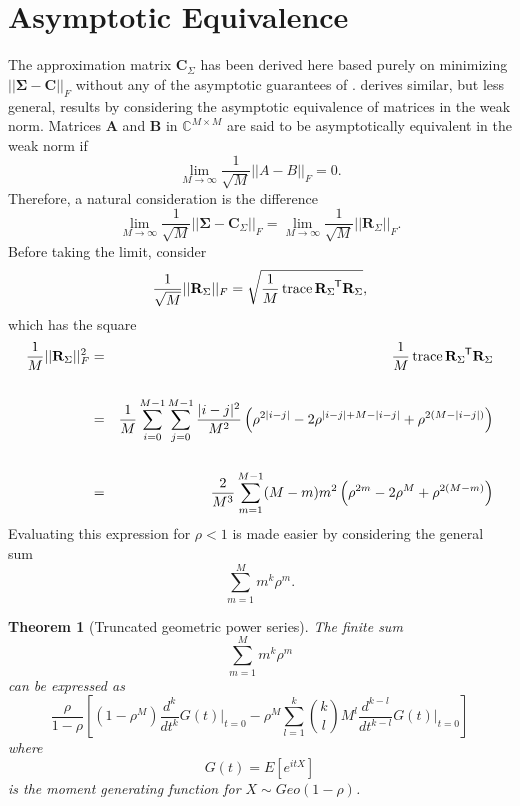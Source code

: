 \documentclass[letterpaper,12pt,oneside,final]{article}
\newtheorem{theorem}{Theorem}
\newcommand{\m}[1]{\mathbf{#1}}               %
\newcommand{\sm}[1]{\boldsymbol{#1}}   %
\newcommand{\tr}[1]{{#1}^{\mkern-1.5mu\mathsf{T}}}              %
\newcommand{\norm}[1]{||{#1}||}              %
\newcommand{\frob}[1]{\norm{#1}_F}
\newcommand{\abs}[1]{\lvert{#1}\rvert}              %
\newcommand*{\trace}{\operatorname{trace}}
\newcommand{\field}[1]{\mathbb{#1}}
\newcommand{\Complex}{\field{C}}
\begin{document}
\section{Asymptotic Equivalence} \label{c:multipleTesting:asympEquiv}

The approximation matrix $\m{C}_{\Sigma}$ has been derived here based purely on minimizing $\frob{\sm{\Sigma} - \m{C}}$ without any of the asymptotic guarantees of \cite{grenanderszego1958}. \cite{gray2006toeplitz} derives similar, but less general, results by considering the asymptotic equivalence of matrices in the weak norm. Matrices $\m{A}$ and $\m{B}$ in $\Complex^{M \times M}$ are said to be asymptotically equivalent in the weak norm if
$$\lim_{M \rightarrow \infty} \frac{1}{\sqrt{M}} \frob{A - B} = 0.$$
Therefore, a natural consideration is the difference
\begin{equation} \label{eq:multipleTesting:asympEq}
  \lim_{M \rightarrow \infty} \frac{1}{\sqrt{M}} \frob{\sm{\Sigma} - \m{C}_{\Sigma}} = \lim_{M \rightarrow \infty} \frac{1}{\sqrt{M}} \frob{\m{R}_{\Sigma}}.
\end{equation}
Before taking the limit, consider
$$\frac{1}{\sqrt{M}} \frob{\m{R}_{\Sigma}} =  \sqrt{ \frac{1}{M} \trace{\tr{\m{R}_{\Sigma}} \m{R}_{\Sigma}} },$$
which has the square
\begin{eqnarray}
    \frac{1}{M} \frob{\m{R}_{\Sigma}}^2 & = &  \frac{1}{M} \trace{\tr{\m{R}_{\Sigma}} \m{R}_{\Sigma}} \nonumber \\
    & & \nonumber \\
    & = & \frac{1}{M} \sum_{i = 0}^{M-1} \sum_{j = 0}^{M-1} \frac{\abs{i-j}^2}{M^2} \left ( \rho^{2\abs{i-j}} - 2 \rho^{\abs{i-j} + M - \abs{i-j}} + \rho^{2(M - \abs{i-j})} \right ) \nonumber \\
    & & \nonumber \\
    & = & \frac{2}{M^3} \sum_{m = 1}^{M-1} (M-m) m^2 \left ( \rho^{2m} - 2 \rho^{M} + \rho^{2(M - m)} \right ) \label{eq:asymTrace}
\end{eqnarray}
Evaluating this expression for $\rho < 1$ is made easier by considering the general sum
$$\sum_{m = 1}^{M} m^k \rho^m.$$
\begin{theorem}[Truncated geometric power series] \label{thm:trunkmoment}
  The finite sum
  $$\sum_{m = 1}^{M} m^k \rho^m$$
  can be expressed as
  $$\frac{\rho}{1 - \rho} \left [ (1 - \rho^M) \frac{d^k}{dt^k} G(t) \Big |_{t = 0} - \rho^{M} \sum_{l = 1}^k {k \choose l} M^l \frac{d^{k-l}}{dt^{k-l}} G(t) \Big |_{t = 0} \right ]$$
  where
  $$G(t) = E[e^{itX}]$$
  is the moment generating function for $X \sim Geo(1 - \rho)$.
\end{theorem}
\end{document}
